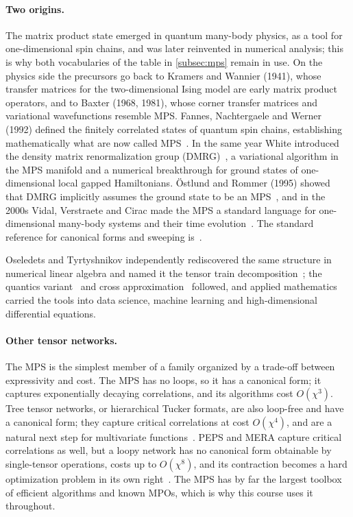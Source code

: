 \paragraph{Two origins.}
The matrix product state emerged in quantum many-body physics, as a tool for
one-dimensional spin chains, and was later reinvented in numerical analysis;
this is why both vocabularies of the table in \cref{subsec:mps} remain in use.
On the physics side the precursors go back to Kramers and Wannier (1941), whose
transfer matrices for the two-dimensional Ising model are early matrix product
operators, and to Baxter (1968, 1981), whose corner transfer matrices and
variational wavefunctions resemble MPS. Fannes, Nachtergaele and Werner (1992)
defined the finitely correlated states of quantum spin chains, establishing
mathematically what are now called MPS~\cite{Fannes1992}. In the same year
White introduced the density matrix renormalization group
(DMRG)~\cite{White1992}, a variational algorithm in the MPS manifold and a
numerical breakthrough for ground states of one-dimensional local gapped
Hamiltonians. Östlund and Rommer (1995) showed that DMRG implicitly assumes the
ground state to be an MPS~\cite{Ostlund1995}, and in the 2000s Vidal,
Verstraete and Cirac made the MPS a standard language for one-dimensional
many-body systems and their time evolution~\cite{Vidal2003,Vidal2004,Verstraete2008}. The standard reference for canonical forms and sweeping
is~\cite{Schollwoeck2011}.

Oseledets and Tyrtyshnikov independently rediscovered the same structure in
numerical linear algebra and named it the tensor train
decomposition~\cite{Oseledets2011}; the quantics variant~\cite{Khoromskij2011}
and cross approximation~\cite{Oseledets2010} followed, and applied mathematics
carried the tools into data science, machine learning and high-dimensional
differential equations.

\paragraph{Other tensor networks.}
The MPS is the simplest member of a family organized by a trade-off between
expressivity and cost. The MPS has no loops, so it has a canonical form; it
captures exponentially decaying correlations, and its algorithms cost
$O(\chi^3)$. Tree tensor networks, or hierarchical Tucker formats, are also
loop-free and have a canonical form; they capture critical correlations at cost
$O(\chi^4)$, and are a natural next step for multivariate
functions~\cite{Tindall2024a}. PEPS and MERA capture critical correlations as
well, but a loopy network has no canonical form obtainable by single-tensor
operations, costs up to $O(\chi^8)$, and its contraction becomes a hard
optimization problem in its own right~\cite{Gray2021}. The MPS has by far the
largest toolbox of efficient algorithms and known MPOs, which is why this
course uses it throughout.

